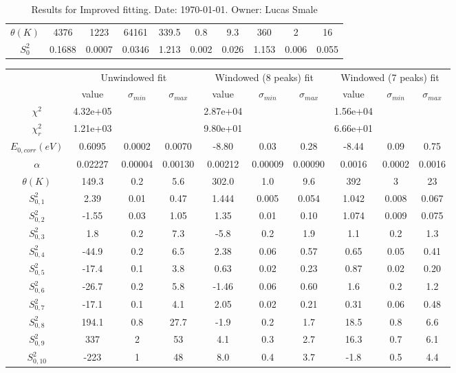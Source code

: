 \documentclass{article}
\begin{document}
\begin{landscape}
\begin{table}[ht]
\begin{tabular}{c||c|c|c||c|c|c||c|c|c}
$\theta (K) $   & 4376 & 1223 & 64161 & 339.5 & 0.8 & 9.3 & 360 & 2 & 16 \\
$S^2_{0}$& 0.1688 & 0.0007 & 0.0346 & 1.213 & 0.002 & 0.026 & 1.153 & 0.006 & 0.055 \\
\hline
    \end{tabular}
    \caption{Results for Improved fitting. Date: \today. Owner: Lucas Smale}
\end{table}
\begin{table}[ht]
\centering
\begin{tabular}{c||c|c|c||c|c|c||c|c|c}
\hline
&\multicolumn{3}{|c}{Unwindowed fit}&\multicolumn{3}{|c}{Windowed (8 peaks) fit}&\multicolumn{3}{|c}{Windowed (7 peaks) fit}\\
& value & $\sigma_{min}$ & $\sigma_{max}$& value & $\sigma_{min}$ & $\sigma_{max}$& value & $\sigma_{min}$ & $\sigma_{max}$\\
\hline
$\chi^2$   & 4.32e+05 & & & 2.87e+04 & & & 1.56e+04 & & \\
$\chi^2_r$ & 1.21e+03 & & & 9.80e+01 & & & 6.66e+01 & & \\
\hline
$E_{0,corr} (eV)$& 0.6095 & 0.0002 & 0.0070 & -8.80 & 0.03 & 0.28 & -8.44 & 0.09 & 0.75 \\
$\alpha $       & 0.02227 & 0.00004 & 0.00130 & 0.00212 & 0.00009 & 0.00090 & 0.0016 & 0.0002 & 0.0016 \\
$\theta (K) $   & 149.3 & 0.2 & 5.6 & 302.0 & 1.0 & 9.6 & 392 & 3 & 23 \\
$S^2_{0,1}$& 2.39 & 0.01 & 0.47 & 1.444 & 0.005 & 0.054 & 1.042 & 0.008 & 0.067 \\
$S^2_{0,2}$& -1.55 & 0.03 & 1.05 & 1.35 & 0.01 & 0.10 & 1.074 & 0.009 & 0.075 \\
$S^2_{0,3}$& 1.8 & 0.2 & 7.3 & -5.8 & 0.2 & 1.9 & 1.1 & 0.2 & 1.3 \\
$S^2_{0,4}$& -44.9 & 0.2 & 6.5 & 2.38 & 0.06 & 0.57 & 0.65 & 0.05 & 0.41 \\
$S^2_{0,5}$& -17.4 & 0.1 & 3.8 & 0.63 & 0.02 & 0.23 & 0.87 & 0.02 & 0.20 \\
$S^2_{0,6}$& -26.7 & 0.2 & 5.8 & -1.46 & 0.06 & 0.60 & 1.6 & 0.2 & 1.2 \\
$S^2_{0,7}$& -17.1 & 0.1 & 4.1 & 2.05 & 0.02 & 0.21 & 0.31 & 0.06 & 0.48 \\
$S^2_{0,8}$& 194.1 & 0.8 & 27.7 & -1.9 & 0.2 & 1.7 & 18.5 & 0.8 & 6.6 \\
$S^2_{0,9}$& 337 & 2 & 53 & 4.1 & 0.3 & 2.7 & 16.3 & 0.7 & 6.1 \\
$S^2_{0,10}$& -223 & 1 & 48 & 8.0 & 0.4 & 3.7 & -1.8 & 0.5 & 4.4 \\

\end{tabular}
\end{table}
\end{landscape}
\end{document}
